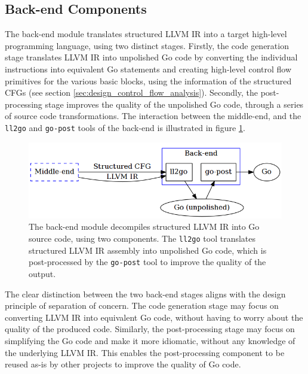 
\subsection{Back-end Components}
\label{sec:design_back-end_components}

The back-end module translates structured LLVM IR into a target high-level programming language, using two distinct stages. Firstly, the code generation stage translates LLVM IR into unpolished Go code by converting the individual instructions into equivalent Go statements and creating high-level control flow primitives for the various basic blocks, using the information of the structured CFGs (see section \ref{sec:design_control_flow_analysis}). Secondly, the post-processing stage improves the quality of the unpolished Go code, through a series of source code transformations. The interaction between the middle-end, and the \texttt{ll2go} and \texttt{go-post} tools of the back-end is illustrated in figure \ref{fig:back-end}.

\begin{figure}[htbp]
	\begin{center}
		\includegraphics[width=\textwidth]{inc/6_design/back-end.png}
		\caption{The back-end module decompiles structured LLVM IR into Go source code, using two components. The \texttt{ll2go} tool translates structured LLVM IR assembly into unpolished Go code, which is post-processed by the \texttt{go-post} tool to improve the quality of the output.}
		\label{fig:back-end}
	\end{center}
\end{figure}

The clear distinction between the two back-end stages aligns with the design principle of separation of concern. The code generation stage may focus on converting LLVM IR into equivalent Go code, without having to worry about the quality of the produced code. Similarly, the post-processing stage may focus on simplifying the Go code and make it more idiomatic, without any knowledge of the underlying LLVM IR. This enables the post-processing component to be reused as-is by other projects to improve the quality of Go code.

